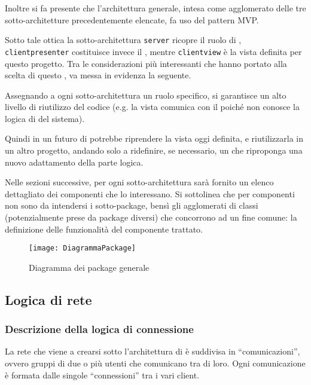 Inoltre si fa presente che l'architettura generale, intesa come agglomerato delle tre sotto-architetture precedentemente elencate, fa uso del pattern MVP\@.

Sotto tale ottica la sotto-architettura \texttt{server} ricopre il ruolo di , \texttt{clientpresenter} costituisce invece il , mentre \texttt{clientview} è la vista definita per questo progetto. Tra le considerazioni più interessanti che hanno portato alla scelta di questo , va messa in evidenza la seguente.

Assegnando a ogni sotto-architettura un ruolo specifico, si garantisce un alto livello di riutilizzo del codice (e.g. la vista comunica con il  poiché non conosce la logica di  del sistema).

Quindi in un futuro di potrebbe riprendere la vista oggi definita, e riutilizzarla in un altro progetto, andando solo a ridefinire, se necessario, un  che riproponga una nuovo adattamento della parte logica.

Nelle sezioni successive, per ogni sotto-architettura sarà fornito un elenco dettagliato dei componenti che lo interessano. Si sottolinea che per componenti non sono da intendersi i sotto-package, bensì gli agglomerati di classi (potenzialmente prese da package diversi) che concorrono ad un fine comune: la definizione delle funzionalità del componente trattato.

\begin{figure}[H]
\centering
  \texttt{[image: DiagrammaPackage]}
  \caption{Diagramma dei package generale}\label{fig:packagegenerale}
\end{figure}
\clearpage

\subsection{Logica di rete}

\subsubsection{Descrizione della logica di connessione}
La rete che viene a crearsi sotto l'architettura di \caName{} è suddivisa in ``comunicazioni'', ovvero gruppi di due o più utenti che comunicano tra di loro. Ogni comunicazione è formata dalle singole ``connessioni'' tra i vari client.

